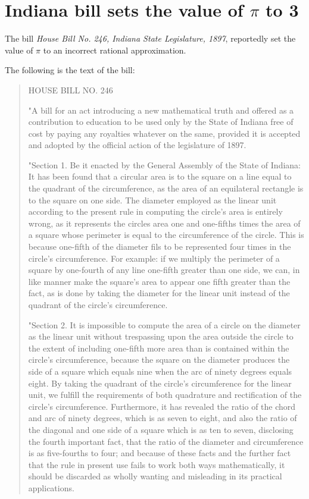 \section{Indiana bill sets the value of $\pi$ to 3}


The bill {\it House Bill No. 246, Indiana State Legislature, 1897},
reportedly set the value of $\pi$ to an incorrect rational approximation.

The following is the text of the bill:

\begin{quote}
HOUSE BILL NO. 246


  "A bill for an act introducing a new mathematical truth and offered as a
contribution to education to be used only by the State of Indiana free of
cost by paying any royalties whatever on the same, provided it is accepted
and adopted by the official action of the legislature of 1897.

   "Section 1. Be it enacted by the General Assembly of the State of Indiana:
It has been found that a circular area is to the square on a line equal to the
quadrant of the circumference, as the area of an equilateral rectangle is to
the square on one side. The diameter employed as the linear unit according to
the present rule in computing the circle's area is entirely wrong, as it
represents the circles area one and one-fifths times the area of a square
whose perimeter is equal to the circumference of the circle. This is because
one-fifth of the diameter fils to be represented four times in the circle's
circumference. For example: if we multiply the perimeter of a square by
one-fourth of any line one-fifth greater than one side, we can, in like
manner make the square's area to appear one fifth greater than the fact, as
is done by taking the diameter for the linear unit instead of the quadrant
of the circle's circumference.

   "Section 2. It is impossible to compute the area of a circle on the
diameter as the linear unit without trespassing upon the area outside the
circle to the extent of including one-fifth more area than is contained within
the circle's circumference, because the square on the diameter produces the
side of a square which equals nine when the arc of ninety degrees equals
eight. By taking the quadrant of the circle's circumference for the linear
unit, we fulfill the requirements of both quadrature and rectification of
the circle's circumference. Furthermore, it has revealed the ratio of the
chord and arc of ninety degrees, which is as seven to eight, and also the
ratio of the diagonal and one side of a square which is as ten to seven,
disclosing the fourth important fact, that the ratio of the diameter and
circumference is as five-fourths to four; and because of these facts and the
further fact that the rule in present use fails to work both ways
mathematically, it should be discarded as wholly wanting and misleading in
its practical applications.



\end{quote}
